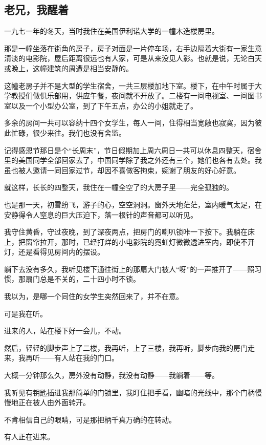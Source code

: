 \subsection{老兄，我醒着}


\par 一九七一年的冬天，当时我住在美国伊利诺大学的一幢木造楼房里。
\par 那是一幢坐落在街角的房子，房子对面是一片停车场，右手边隔着大街有一家生意清淡的电影院，屋后距离很远也有人家，可是从来没见人影。也就是说，无论白天或晚上，这幢建筑的周遭是相当安静的。
\par 这幢老房子并不是大型的学生宿舍，一共三层楼加地下室。楼下，在中午时属于大学教授们做俱乐部用，供应午餐，夜间就不开放了。二楼有一间电视室、一间图书室以及一个小型办公室，到了下午五点，办公的小姐就走了。
\par 多余的房间一共可以容纳十四个女学生，每人一间，住得相当宽敞也寂寞，因为彼此忙碌，很少来往。我们也没有舍监。
\par 记得感恩节那日是个“长周末”，节日假期加上周六周日一共可以休息四整天，宿舍里的美国同学全部回家去了，中国同学除了我之外还有三个，她们也各有去处。我虽也被人邀请一同回家过节，却因不喜做客拘束，婉谢了朋友的好心好意。
\par 就这样，长长的四整天，我住在一幢全空了的大房子里——完全孤独的。
\par 也是那一天，初雪纷飞，游子的心，空空洞洞。窗外天地茫茫，室内暖气太足，在安静得令人窒息的巨大压迫下，落一根针的声音都可以听见。
\par 我守住黄昏，守过夜晚，到了深夜两点，把房门的喇叭锁咔一下按下。我躺在床上，把窗帘拉开，那时，已经打烊的小电影院的霓虹灯微微透进室内，即使不开灯，还是看得见房间内的摆设。
\par 躺下去没有多久，我听见楼下通往街上的那扇大门被人“呀”的一声推开了——照习惯，那扇门总是不关的，二十四小时不锁。
\par 我以为，是哪一个同住的女学生突然回来了，并不在意。
\par 可是我在听。
\par 进来的人，站在楼下好一会儿，不动。
\par 然后，轻轻的脚步声上了二楼，我再听，上了三楼，我再听，脚步向我的房门走来，我再听——有人站在我的门口。
\par 大概一分钟那么久，房外没有动静，我没有动静——我躺着——等。
\par 我听见有钥匙插进我那简单的门锁里，我盯住把手看，幽暗的光线中，那个门柄慢慢地正在被人由外面转开。
\par 不肯相信自己的眼睛，可是那把柄千真万确的在转动。
\par 有人正在进来。

